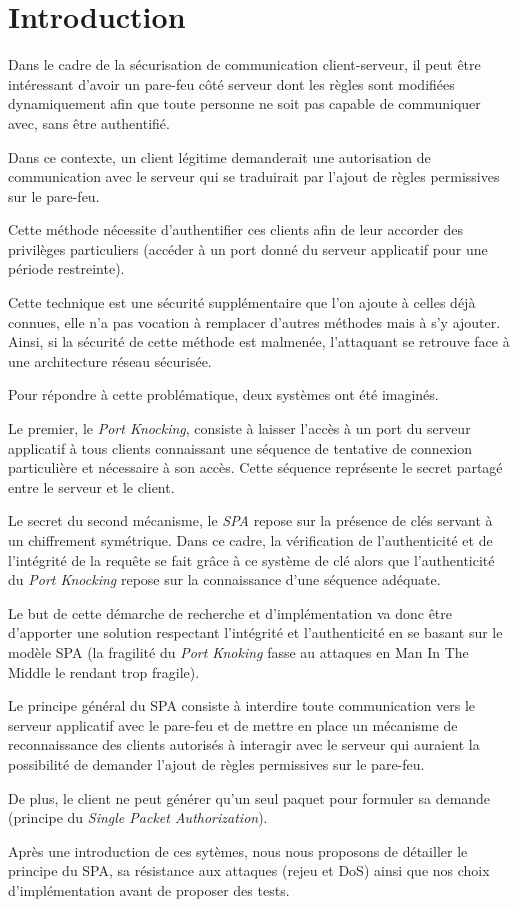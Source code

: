 \chapter*{Introduction}

Dans le cadre de la sécurisation de communication client-serveur, il peut être intéressant d'avoir un pare-feu côté serveur dont les règles sont modifiées dynamiquement afin que toute personne ne soit pas capable de communiquer avec, sans être authentifié.

Dans ce contexte, un client légitime demanderait une autorisation de communication avec le serveur qui se traduirait par l'ajout de règles permissives sur le pare-feu.

Cette méthode nécessite d'authentifier ces clients afin de leur accorder des privilèges particuliers (accéder à un port donné du serveur applicatif pour une période restreinte).

Cette technique est une sécurité supplémentaire que l'on ajoute à celles déjà connues, elle n'a pas vocation à remplacer d'autres méthodes mais à s'y ajouter. Ainsi, si la sécurité de cette méthode est malmenée, l'attaquant se retrouve face à une architecture réseau sécurisée.

Pour répondre à cette problématique, deux systèmes ont été imaginés.

Le premier, le \emph{Port Knocking}, consiste  à laisser l'accès à un port du serveur applicatif à tous clients connaissant une séquence de tentative de connexion particulière et nécessaire à son accès. Cette séquence représente le secret partagé entre le serveur et le client.

Le secret du second mécanisme, le \emph{SPA} repose sur la présence de clés servant à un chiffrement symétrique.
Dans ce cadre, la vérification de l'authenticité et de l'intégrité  de la requête se fait grâce à ce système de clé alors que l'authenticité du \emph{Port Knocking} repose sur la connaissance d'une séquence adéquate. 

Le but de cette démarche de recherche et d'implémentation va donc être d'apporter une solution respectant l'intégrité et l'authenticité en se basant sur le modèle SPA (la fragilité du \emph{Port Knoking} fasse au attaques en Man In The Middle le rendant trop fragile). 

Le principe général du SPA consiste à interdire toute communication vers le serveur applicatif avec le pare-feu et de mettre en place un mécanisme de reconnaissance des clients autorisés à interagir avec le serveur qui auraient la possibilité de demander l'ajout de règles permissives sur le pare-feu.

De plus, le client ne peut générer qu'un seul paquet pour formuler sa demande (principe du \emph{Single Packet Authorization}).

Après une introduction de ces sytèmes, nous nous proposons de détailler le principe du SPA, sa résistance aux attaques (rejeu et DoS) ainsi que nos choix d'implémentation avant de proposer des tests.
